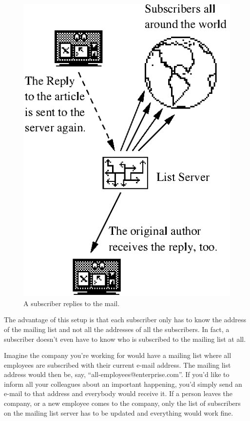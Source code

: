\documentclass[a4paper,10pt]{scrreprt}
\begin{document}
\begin{figure}[bth]
\begin{center}
\includegraphics{ml-principle2.eps}
\caption{A subscriber replies to the mail.}
\end{center}
\end{figure}

The advantage of this setup is that each subscriber only has to know
the address of the mailing list and not all the addresses of all the
subscribers. In fact, a subscriber doesn't even have to know who is
subscribed to the mailing list at all.

Imagine the company you're working for would have a mailing list where
all employees are subscribed with their current e-mail address. The
mailing list address would then be, say,
``all-employees@enterprise.com''. If you'd like to inform all your
colleagues about an important happening, you'd simply send an e-mail
to that address and everybody would receive it. If a person leaves the
company, or a new employee comes to the company, only the list of
subscribers on the mailing list server has to be updated and
everything would work fine.
\end{document}
